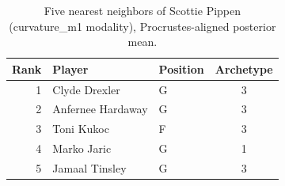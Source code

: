 \begin{table}[htbp]
  \centering\small
  \begin{tabular}{rllc}
    \toprule
    Rank & Player & Position & Archetype \\
    \midrule
    1 & Clyde Drexler & G & 3 \\
    2 & Anfernee Hardaway & G & 3 \\
    3 & Toni Kukoc & F & 3 \\
    4 & Marko Jaric & G & 1 \\
    5 & Jamaal Tinsley & G & 3 \\
    \bottomrule
  \end{tabular}
  \caption{Five nearest neighbors of Scottie Pippen (curvature_m1 modality), Procrustes-aligned posterior mean.}
  \label{tab:Scottie_Pippen_neighbors_curvature_m1}
\end{table}


